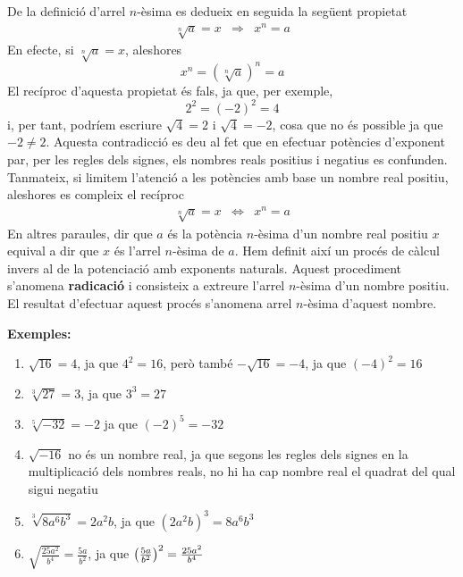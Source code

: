 De la definició d’arrel $n$-èsima es dedueix en seguida la
següent propietat%
\begin{equation*}
\begin{array}{ccc}
\sqrt[n]{a}=x & \Longrightarrow & x^{n}=a%
\end{array}%
\end{equation*}%
En efecte, si $\sqrt[n]{a}=x$, aleshores%
\begin{equation*}
x^{n}=\left( \sqrt[n]{a}\right) ^{n}=a
\end{equation*}%
El recíproc d’aquesta propietat és fals, ja que, per exemple,%
\begin{equation*}
2^{2}=(-2)^{2}=4
\end{equation*}%
i, per tant, podríem escriure $\sqrt{4}=2$ i $\sqrt{4}=-2$, cosa que
no és possible ja que $-2\neq 2$. Aquesta contradicció es deu al fet que en efectuar potències d’exponent par, per les regles dels signes,
els nombres reals positius i negatius es confunden. Tanmateix, si
limitem l’atenció a les potències amb base un nombre real
positiu, aleshores es compleix el recíproc%
\begin{equation*}
\begin{array}{ccc}
\sqrt[n]{a}=x & \Longleftrightarrow & x^{n}=a%
\end{array}%
\end{equation*}%
En altres paraules, dir que $a$ és la potència $n$-èsima d’un nombre real positiu $x$ equival a dir que $x$ és l’arrel $n$-èsima de $a$. Hem definit així un procés de càlcul invers al de
la potenciació amb exponents naturals. Aquest procediment s’anomena \textbf{radicació} i consisteix a extreure l’arrel $n$-èsima d’un nombre positiu. El resultat d’efectuar aquest procés s’anomena arrel $n$-èsima d’aquest nombre.

\textbf{Exemples:}

\begin{enumerate}
\item $\sqrt{16}=4$, ja que $4^{2}=16$, però també $-\sqrt{16}=-4$, ja
que $(-4)^{2}=16$

\item $\sqrt[3]{27}=3$, ja que $3^{3}=27$

\item $\sqrt[5]{-32}=-2$ ja que $(-2)^{5}=-32$

\item $\sqrt{-16}$ no és un nombre real, ja que segons les regles dels
signes en la multiplicació dels nombres reals, no hi ha cap nombre real el quadrat del qual sigui negatiu

\item $\sqrt[3]{8a^{6}b^{3}}=2a^{2}b$, ja que $(2a^{2}b)^{3}=8a^{6}b^{3}$

\item $\sqrt{\frac{25a^{2}}{b^{4}}}=\frac{5a}{b^{2}}$, ja que $\left( \frac{%
5a}{b^{2}}\right) ^{2}=\frac{25a^{2}}{b^{4}}$
\end{enumerate}

